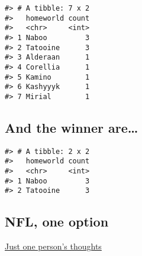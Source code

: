 \documentclass[
]{book}
\begin{document}
\begin{verbatim}
#> # A tibble: 7 x 2
#>   homeworld count
#>   <chr>     <int>
#> 1 Naboo         3
#> 2 Tatooine      3
#> 3 Alderaan      1
#> 4 Corellia      1
#> 5 Kamino        1
#> 6 Kashyyyk      1
#> 7 Mirial        1
\end{verbatim}

\hypertarget{and-the-winner-are}{%
\subsection{And the winner are\ldots{}}\label{and-the-winner-are}}

\begin{verbatim}
#> # A tibble: 2 x 2
#>   homeworld count
#>   <chr>     <int>
#> 1 Naboo         3
#> 2 Tatooine      3
\end{verbatim}

\hypertarget{nfl-one-option}{%
\subsection{NFL, one option}\label{nfl-one-option}}

\href{https://rpubs.com/afuecker/727520}{Just one person's thoughts}

  
\end{document}
